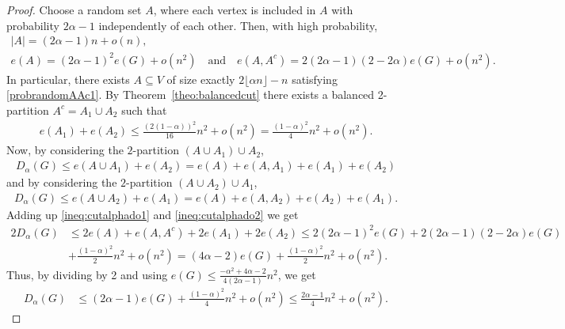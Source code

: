 \documentclass[11pt]{article}
\theoremstyle{definition}
\numberwithin{theo}{section}
\begin{document}
\begin{proof}
Choose a random set $A$, where each vertex is included in $A$ with probability $2\alpha-1$ independently of each other. Then, with high probability,
\begin{gather}
\nonumber
    |A|=(2\alpha-1)n +o(n), \\
\label{probrandomAAc1}
e(A)=(2\alpha-1)^2e(G)+o(n^2) \quad \text{and} \quad e(A,A^c)=2(2\alpha-1)(2-2\alpha)e(G)+o(n^2).
\end{gather}
In particular, there exists $A\subseteq V$ of size exactly $2\lfloor\alpha n\rfloor-n$ satisfying \eqref{probrandomAAc1}. By Theorem~\ref{theo:balancedcut} there exists a balanced 2-partition $A^c=A_1\cup A_2$ such that 
\begin{align*}
    e(A_1)+e(A_2)\leq \frac{(2(1-\alpha))^2}{16}n^2 +o(n^2)=\frac{(1-\alpha)^2}{4}n^2+o(n^2).
\end{align*}
Now, by considering the $2$-partition $(A\cup A_1)\cup A_2$,
\begin{align}
\label{ineq:cutalphado1}
    D_\alpha(G)\leq e(A\cup A_1)+e(A_2)=e(A)+e(A,A_1)+e(A_1)+e(A_2)
\end{align}
and by considering the $2$-partition $(A\cup A_2)\cup A_1$,
\begin{align}
\label{ineq:cutalphado2}
    D_\alpha(G)\leq e(A\cup A_2)+e(A_1)=e(A)+e(A,A_2)+e(A_2)+e(A_1). 
\end{align}
Adding up \eqref{ineq:cutalphado1} and \eqref{ineq:cutalphado2} we get
\begin{align*}
    2D_\alpha(G)&\leq 2e(A)+e(A,A^c)+2e(A_1)+2e(A_2)\leq 2(2\alpha-1)^2e(G)+2(2\alpha-1)(2-2\alpha)e(G)\\ &+\frac{(1-\alpha)^2}{2}n^2+o(n^2)= \left(4\alpha-2\right)e(G)+ \frac{(1-\alpha)^2}{2}n^2+o(n^2).
\end{align*}
Thus, by dividing by 2 and using $e(G)\leq \frac{-\alpha^2+4\alpha-2}{4(2\alpha-1)}n^2$, we get
\begin{align*}
    D_\alpha(G)&\leq \left(2\alpha-1\right)e(G)+ \frac{(1-\alpha)^2}{4}n^2+o(n^2)\leq  \frac{2\alpha-1}{4}n^2+o(n^2).
\end{align*}
\end{proof}
\end{document}
